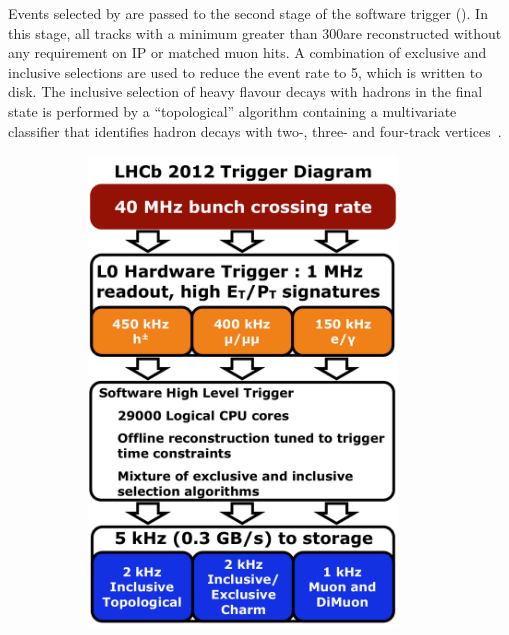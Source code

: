 Events selected by \hltone are passed to the second stage of the software trigger (\hlttwo). In this stage, all tracks with a minimum \pt greater than 300\mevc are reconstructed without any requirement on IP or matched muon hits. A combination of exclusive and inclusive selections are used to reduce the event rate to 5\khz, which is written to disk. The inclusive selection of heavy flavour decays with hadrons in the final state is performed by a ``topological'' algorithm containing a multivariate classifier that identifies \bquark hadron decays with two-, three- and four-track vertices~\cite{trigger-inclusive,trigger-topo}.

\begin{figure}[!tb]
\begin{subfigure}{0.49\textwidth}
\includegraphics[width=0.9\textwidth]{figs/detector/trigger-run1.pdf}
\caption{}
\label{fig:trigger:run1}
\end{subfigure}

\end{figure}
